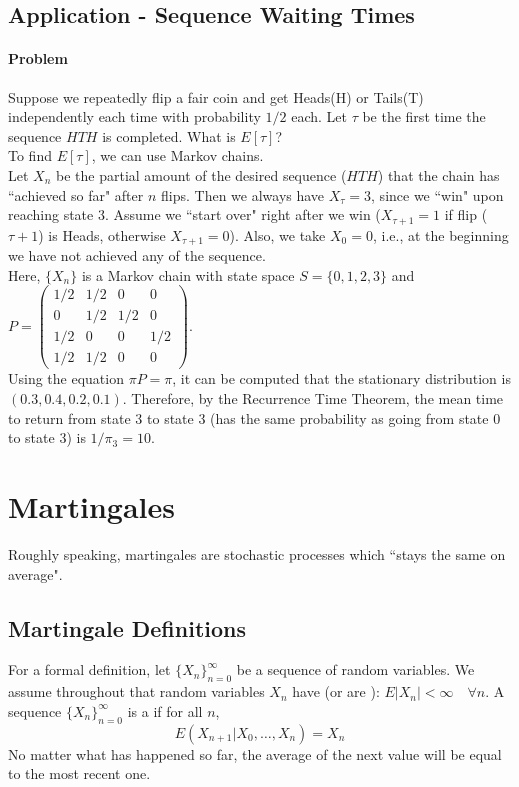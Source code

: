 \documentclass[11pt]{article}
\begin{document}
    \subsection{Application - Sequence Waiting Times}
    \paragraph{Problem}
    Suppose we repeatedly flip a fair coin and get Heads(H) or Tails(T) independently each time with probability $1/2$ each. Let $\tau$ be the first time the sequence $HTH$ is completed. What is $E[\tau]$?\\
    To find $E[\tau]$, we can use Markov chains.\\
    Let $X_n$ be the partial amount of the desired sequence ($HTH$) that the chain has ``achieved so far" after $n$ flips. Then we always have $X_\tau = 3$, since we ``win" upon reaching state 3. Assume we ``start over" right after we win ($X_{\tau + 1} = 1$ if flip ($\tau + 1$) is Heads, otherwise $X_{\tau+1} = 0$). Also, we take $X_0 = 0$, i.e., at the beginning we have not achieved any of the sequence.\\
    Here, $\{X_n\}$ is a Markov chain with state space $S= \{0, 1, 2, 3\}$ and $P = \begin{pmatrix}
    	1/2 & 1/2 & 0 & 0\\
    	0 & 1/2 & 1/2 & 0\\
    	1/2 & 0 & 0 & 1/2\\
    	1/2 & 1/2 & 0 & 0
    \end{pmatrix}$. \\
    Using the equation $\pi P = \pi$, it can be computed that the stationary distribution is $(0.3, 0.4, 0.2, 0.1)$. Therefore, by the Recurrence Time Theorem, the mean time to return from state 3 to state 3 (has the same probability as going from state 0 to state 3) is $1/\pi_3 = 10$.
    
    
    \section{Martingales}
    Roughly speaking, martingales are stochastic processes which ``stays the same on average".
    \subsection{Martingale Definitions}
    For a formal definition, let $\{X_n\}_{n=0}^\infty$ be a sequence of random variables. We assume throughout that random variables $X_n$ have  (or are ): $E|X_n| < \infty \quad \forall n$.
    A sequence $\{X_n\}_{n=0}^\infty$ is a  if for all $n$,
    $$E(X_{n+1}|X_0, \hdots, X_n) = X_n$$
    \remark
    No matter what has happened so far, the average of the next value will be equal to the most recent one. \\
\end{document}
